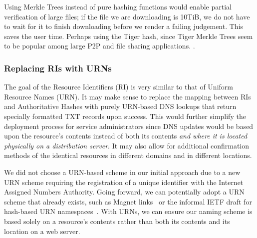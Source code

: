 Using Merkle Trees instead of pure hashing functions would enable partial
verification of large files; \ie{} if the file we are downloading is 10TiB, we
do not have to wait for it to finish downloading before we render a failing
judgement. This saves the user time. Perhaps using the Tiger hash, since Tiger
Merkle Trees seem to be popular among large P2P and file sharing applications.
.

\subsubsection{Replacing RIs with URNs}

The goal of the Resource Identifiers (RI) is very similar to that of Uniform
Resource Names (URN). It may make sense to replace the mapping between RIs and
Authoritative Hashes with purely URN-based DNS lookups that return specially
formatted TXT records upon success. This would further simplify the deployment
process for service administrators since DNS updates would be based upon the
resource's contents instead of both its contents \textit{and where it is located
physically on a distribution server}. It may also allow for additional
confirmation methods of the identical resources in different domains and in
different locations.

We did not choose a URN-based scheme in our initial approach due to a new URN
scheme requiring the registration of a unique identifier with the Internet
Assigned Numbers Authority. Going forward, we can potentially adopt a URN scheme
that already exists, such as Magnet links~\cite{MagnetLinks} or the informal
IETF draft for hash-based URN namespaces~\cite{draft-URN}. With URNs, we can
ensure our naming scheme is based solely on a resource's contents rather than
both its contents and its location on a web server.
